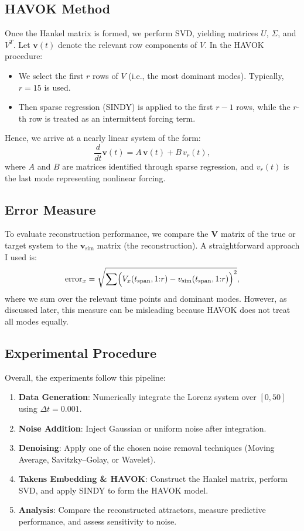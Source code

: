 \documentclass[11pt]{article}
\begin{document}
	\subsection{HAVOK Method}
	Once the Hankel matrix is formed, we perform SVD, yielding matrices \(U\), \(\Sigma\), and \(V^T\). Let \(\mathbf{v}(t)\) denote the relevant row components of \(V\). In the HAVOK procedure:
	\begin{itemize}
		\item We select the first \(r\) rows of \(V\) (i.e., the most dominant modes). Typically, \(r=15\) is used.
		\item Then sparse regression (SINDY) is applied to the first \(r-1\) rows, while the \(r\)-th row is treated as an intermittent forcing term.
	\end{itemize}
	Hence, we arrive at a nearly linear system of the form:
	\begin{equation}
		\frac{d}{dt}\mathbf{v}(t) = A\,\mathbf{v}(t) + B\,v_r(t),
		\label{eq:havok}
	\end{equation}
	where \(A\) and \(B\) are matrices identified through sparse regression, and \(v_r(t)\) is the last mode representing nonlinear forcing.
	
	\subsection{Error Measure}
	To evaluate reconstruction performance, we compare the \(\mathbf{V}\) matrix of the true or target system to the \(\mathbf{v}_{\text{sim}}\) matrix (the reconstruction). A straightforward approach I used is:
	\begin{equation}
		\text{error}_x = \sqrt{\sum \Bigl( V_x(t_{\text{span}},1{:}r) - v_{\text{sim}}(t_{\text{span}},1{:}r) \Bigr)^2 },
	\end{equation}
	where we sum over the relevant time points and dominant modes. However, as discussed later, this measure can be misleading because HAVOK does not treat all modes equally.
	
	\subsection{Experimental Procedure}
	Overall, the experiments follow this pipeline:
	\begin{enumerate}
		\item \textbf{Data Generation}: Numerically integrate the Lorenz system over \([0,50]\) using \(\Delta t = 0.001\).
		\item \textbf{Noise Addition}: Inject Gaussian or uniform noise after integration.
		\item \textbf{Denoising}: Apply one of the chosen noise removal techniques (Moving Average, Savitzky--Golay, or Wavelet).
		\item \textbf{Takens Embedding \& HAVOK}: Construct the Hankel matrix, perform SVD, and apply SINDY to form the HAVOK model.
		\item \textbf{Analysis}: Compare the reconstructed attractors, measure predictive performance, and assess sensitivity to noise.
	\end{enumerate}
	
\end{document}
